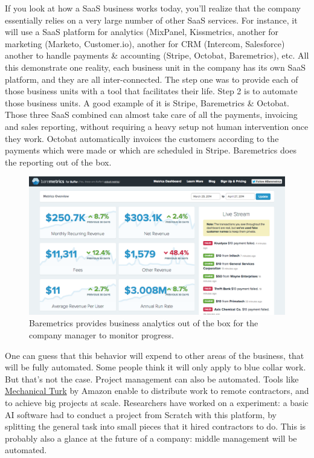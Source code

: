 \documentclass[12pt]{article}
\begin{document}
If you look at how a SaaS business works today, you'll realize that the company
essentially relies on a very large number of other SaaS services. For instance,
it will use a SaaS platform for analytics (MixPanel, Kissmetrics, another for
marketing (Marketo, Customer.io), another for CRM (Intercom, Salesforce) another
to handle payments \& accounting (Stripe, Octobat, Baremetrics), etc.
All this demonstrate one reality, each business unit in the company has its own
SaaS platform, and they are all inter-connected. The step one was to provide
each of those business units with a tool that facilitates their life. Step 2 is
to automate those business units. A good example of it is Stripe, Baremetrics
\& Octobat. Those three SaaS combined can almost take care of all the payments,
invoicing and sales reporting, without requiring a heavy setup not human
intervention once they work. Octobat automatically invoices the customers
according to the payments which were made or which are scheduled in Stripe.
Baremetrics does the reporting out of the box.

\begin{figure}[h]
    \centering
    \includegraphics[width=\textwidth]{baremetrics}
    \caption{Baremetrics provides business analytics out of the box for the
    company manager to monitor progress.}
    \label{fig:uber-graph}
\end{figure}

\smallskip

One can guess that this behavior will expend to other areas of the business,
that will be fully automated. Some people think it will only apply to blue
collar work. But that's not the case. Project management can also be automated.
Tools like \href{https://www.mturk.com/mturk/welcome}{Mechanical Turk} by Amazon
enable to distribute work to remote contractors, and to achieve big projects at
scale. Researchers have worked on a experiment: a basic AI software had to
conduct a project from Scratch with this platform, by splitting the general
task into small pieces that it hired contractors to do. This is probably also a
glance at the future of a company: middle management will be automated.
\end{document}
